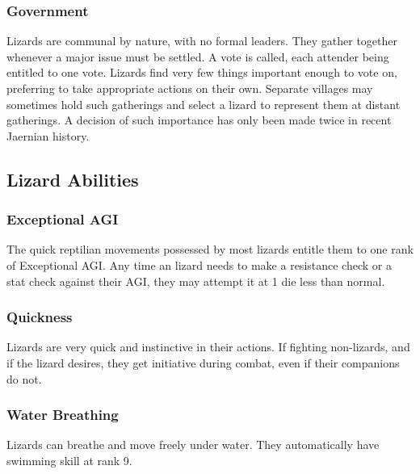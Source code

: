 \begin{multicols*}{2}
\subsubsection{Government}
Lizards are communal by nature, with no formal leaders. They gather together whenever a major issue must be settled. A vote is called, each attender being entitled to one vote. Lizards find very few things important enough to vote on, preferring to take appropriate actions on their own. Separate villages may sometimes hold such gatherings and select a lizard to represent them at distant gatherings. A decision of such importance has only been made twice in recent Jaernian history.
\subsection{Lizard Abilities}
\subsubsection{Exceptional AGI}
The quick reptilian movements possessed by most lizards entitle them to one rank of Exceptional AGI. Any
time an lizard needs to make a resistance check or a stat check
against their AGI, they may attempt it at 1 die less than normal.
\subsubsection{Quickness}
Lizards are very quick and instinctive in their actions. If fighting non-lizards, and if the lizard desires, they get initiative during combat, even if their companions do not.
\subsubsection{Water Breathing}
Lizards can breathe and move freely under water. They automatically have swimming skill at rank 9.
\end{multicols*}